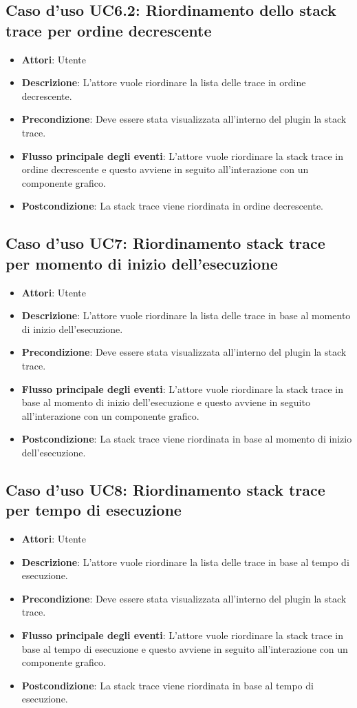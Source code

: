 \subsection{Caso d'uso UC6.2: Riordinamento dello stack trace per ordine decrescente}
\begin{itemize}
	\item \textbf{Attori}: Utente
	\item \textbf{Descrizione}: L'attore vuole riordinare la lista delle trace in ordine decrescente.
	\item \textbf{Precondizione}: Deve essere stata visualizzata all'interno del plugin la stack trace.
	\item \textbf{Flusso principale degli eventi}: L'attore vuole riordinare la stack trace in ordine decrescente e questo avviene in seguito all'interazione con un componente grafico.
	\item \textbf{Postcondizione}: La stack trace viene riordinata in ordine decrescente.
\end{itemize}
\subsection{Caso d'uso UC7: Riordinamento stack trace per momento di inizio dell'esecuzione}
\begin{itemize}
	\item \textbf{Attori}: Utente
	\item \textbf{Descrizione}: L'attore vuole riordinare la lista delle trace in base al momento di inizio dell'esecuzione.
	\item \textbf{Precondizione}: Deve essere stata visualizzata all'interno del plugin la stack trace.
	\item \textbf{Flusso principale degli eventi}: L'attore vuole riordinare la stack trace in base al momento di inizio dell'esecuzione e questo avviene in seguito all'interazione con un componente grafico.
	\item \textbf{Postcondizione}: La stack trace viene riordinata in base al momento di inizio dell'esecuzione.
\end{itemize}
\subsection{Caso d'uso UC8: Riordinamento stack trace per tempo di esecuzione}
\begin{itemize}
	\item \textbf{Attori}: Utente
	\item \textbf{Descrizione}: L'attore vuole riordinare la lista delle trace in base al tempo di esecuzione.
	\item \textbf{Precondizione}: Deve essere stata visualizzata all'interno del plugin la stack trace.
	\item \textbf{Flusso principale degli eventi}: L'attore vuole riordinare la stack trace in base al tempo di esecuzione e questo avviene in seguito all'interazione con un componente grafico.
	\item \textbf{Postcondizione}: La stack trace viene riordinata in base al tempo di esecuzione.
\end{itemize}
